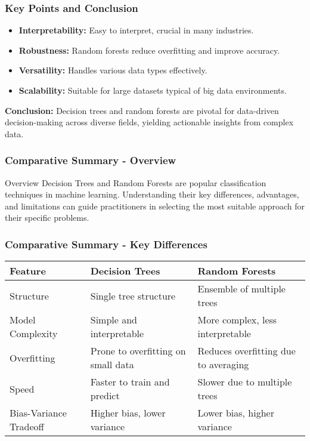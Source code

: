 \documentclass[aspectratio=169]{beamer}
\begin{document}
\begin{frame}[fragile]
    \frametitle{Key Points and Conclusion}
    \begin{itemize}
        \item \textbf{Interpretability:} Easy to interpret, crucial in many industries.
        \item \textbf{Robustness:} Random forests reduce overfitting and improve accuracy.
        \item \textbf{Versatility:} Handles various data types effectively.
        \item \textbf{Scalability:} Suitable for large datasets typical of big data environments.
    \end{itemize}
    
    \textbf{Conclusion:} Decision trees and random forests are pivotal for data-driven decision-making across diverse fields, yielding actionable insights from complex data.
\end{frame}

\begin{frame}[fragile]
    \frametitle{Comparative Summary - Overview}
    \begin{block}{Overview}
        Decision Trees and Random Forests are popular classification techniques in machine learning. 
        Understanding their key differences, advantages, and limitations can guide practitioners in selecting 
        the most suitable approach for their specific problems.
    \end{block}
\end{frame}

\begin{frame}[fragile]
    \frametitle{Comparative Summary - Key Differences}
    \begin{table}[ht]
        \centering
        \begin{tabular}{|l|l|l|}
            \hline
            \textbf{Feature} & \textbf{Decision Trees} & \textbf{Random Forests} \\
            \hline
            Structure & Single tree structure & Ensemble of multiple trees \\
            Model Complexity & Simple and interpretable & More complex, less interpretable \\
            Overfitting & Prone to overfitting on small data & Reduces overfitting due to averaging \\
            Speed & Faster to train and predict & Slower due to multiple trees \\
            Bias-Variance Tradeoff & Higher bias, lower variance & Lower bias, higher variance \\
            \hline
        \end{tabular}
    \end{table}
\end{frame}
\end{document}
